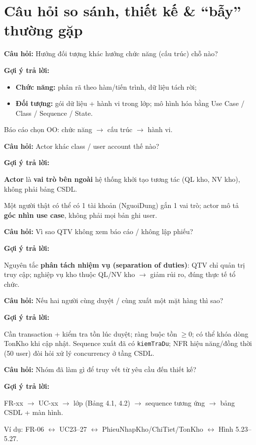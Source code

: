 \documentclass[12pt,a4paper]{article}
\newcommand{\cau}[1]{\textbf{\textcolor{qblue}{Câu hỏi:}} #1}
\newcommand{\traloi}{\par\smallskip\textbf{\textcolor{qblue!70!black}{Gợi ý trả lời:}}\par}
\begin{document}
\section{Câu hỏi so sánh, thiết kế \& ``bẫy'' thường gặp}

\begin{cauhoi}[Câu 32]
\cau{Hướng đối tượng khác hướng chức năng (cấu trúc) chỗ nào?}
\traloi
\begin{itemize}[leftmargin=1.4em,itemsep=2pt]
  \item \textbf{Chức năng:} phân rã theo hàm/tiến trình, dữ liệu tách rời;
  \item \textbf{Đối tượng:} gói dữ liệu + hành vi trong lớp; mô hình hóa bằng Use Case / Class / Sequence / State.
\end{itemize}
Báo cáo chọn OO: chức năng $\rightarrow$ cấu trúc $\rightarrow$ hành vi.
\end{cauhoi}

\begin{cauhoi}[Câu 33]
\cau{Actor khác class / user account thế nào?}
\traloi
\textbf{Actor} là \textbf{vai trò bên ngoài} hệ thống khởi tạo tương tác (QL kho, NV kho), không phải bảng CSDL.

Một người thật có thể có 1 tài khoản (NguoiDung) gắn 1 vai trò; actor mô tả \textbf{góc nhìn use case}, không phải mọi bản ghi user.
\end{cauhoi}

\begin{cauhoi}[Câu 34]
\cau{Vì sao QTV không xem báo cáo / không lập phiếu?}
\traloi
Nguyên tắc \textbf{phân tách nhiệm vụ (separation of duties)}: QTV chỉ quản trị truy cập; nghiệp vụ kho thuộc QL/NV kho $\rightarrow$ giảm rủi ro, đúng thực tế tổ chức.
\end{cauhoi}

\begin{cauhoi}[Câu 35]
\cau{Nếu hai người cùng duyệt / cùng xuất một mặt hàng thì sao?}
\traloi
Cần transaction + kiểm tra tồn lúc duyệt; ràng buộc tồn $\geq 0$; có thể khóa dòng TonKho khi cập nhật. Sequence xuất đã có \texttt{kiemTraDu}; NFR hiệu năng/đồng thời (50 user) đòi hỏi xử lý concurrency ở tầng CSDL.
\end{cauhoi}

\begin{cauhoi}[Câu 36]
\cau{Nhóm đã làm gì để truy vết từ yêu cầu đến thiết kế?}
\traloi
FR-xx $\rightarrow$ UC-xx $\rightarrow$ lớp (Bảng 4.1, 4.2) $\rightarrow$ sequence tương ứng $\rightarrow$ bảng CSDL + màn hình.

Ví dụ: FR-06 $\leftrightarrow$ UC23--27 $\leftrightarrow$ PhieuNhapKho/ChiTiet/TonKho $\leftrightarrow$ Hình 5.23--5.27.
\end{cauhoi}
\end{document}
